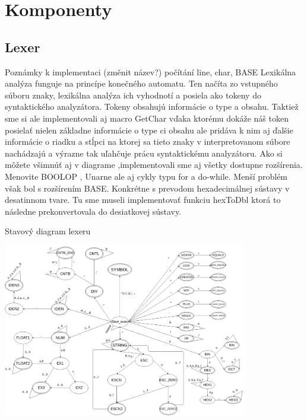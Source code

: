 \documentclass[13pt]{beamer}
\begin{document}
\section{Komponenty}
\subsection{Lexer}

\begin{frame}{Poznámky k implementaci (změnit název?)}
  počítání line, char, BASE
  \note Lexikálna analýza funguje na princípe konečného automatu. Ten načíta zo vstupného súboru znaky, lexikálna analýza ich vyhodnotí a posiela ako tokeny do syntaktického analyzátora. Tokeny obsahujú informácie o type a obsahu. Taktiež sme si ale implementovali aj macro GetChar vďaka ktorému dokáže náš token posielať nielen základne informácie o type ci obsahu ale pridáva k nim aj ďalšie informácie o riadku a stĺpci na ktorej sa tieto znaky v interpretovanom súbore nachádzajú a výrazne tak uľahčuje prácu syntaktickému analyzátoru.
  \note Ako si môžete všimnúť aj v diagrame ,implementovali sme aj všetky dostupne rozšírenia. Menovite BOOLOP , Unarne ale aj cykly typu for a do-while. Menší problém však bol s rozšírením BASE. Konkrétne s prevodom hexadecimálnej sústavy v desatinnom tvare. Tu sme museli implementovať funkciu hexToDbl ktorá to následne prekonvertovala do desiatkovej sústavy.
\end{frame}

\begin{frame}{Stavový diagram lexeru}
  \begin{center}
    \includegraphics[width=0.8\textwidth]{img/lex1.pdf}
  \end{center}
\end{frame}
\end{document}
